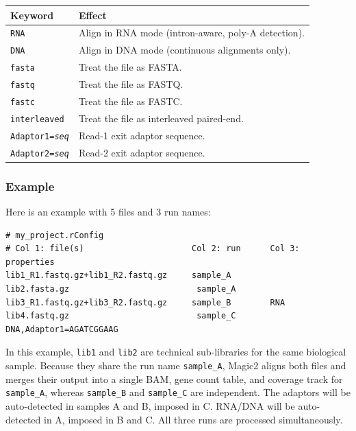 \documentclass[11pt]{article}
\newcommand{\code}[1]{\texttt{#1}}
\begin{document}
\medskip
\begin{center}
\begin{tabular}{lp{9.5cm}}
\toprule
\textbf{Keyword} & \textbf{Effect} \\
\midrule
\code{RNA}                   & Align in RNA mode (intron-aware, poly-A detection). \\
\code{DNA}                   & Align in DNA mode (continuous alignments only). \\
\code{fasta}                 & Treat the file as FASTA. \\
\code{fastq}                 & Treat the file as FASTQ. \\
\code{fastc}                 & Treat the file as FASTC. \\
\code{interleaved}           & Treat the file as interleaved paired-end. \\
\code{Adaptor1=\textit{seq}} & Read-1 exit adaptor sequence. \\
\code{Adaptor2=\textit{seq}} & Read-2 exit adaptor sequence. \\
\bottomrule
\end{tabular}
\end{center}
\medskip



\subsubsection{Example}

Here is an example with 5 files and 3 run names:

\begin{lstlisting}
# my_project.rConfig
# Col 1: file(s)                      Col 2: run      Col 3: properties
lib1_R1.fastq.gz+lib1_R2.fastq.gz     sample_A        
lib2.fasta.gz                          sample_A       
lib3_R1.fastq.gz+lib3_R2.fastq.gz     sample_B        RNA
lib4.fastq.gz                          sample_C       DNA,Adaptor1=AGATCGGAAG
\end{lstlisting}

In this example, \code{lib1} and \code{lib2} are technical sub-libraries
for the same biological sample.  Because they share the run name
\code{sample\_A}, Magic2 aligns both files and merges their output into
a single BAM, gene count table, and coverage track for \code{sample\_A},
whereas \code{sample\_B} and \code{sample\_C} are independent.
The adaptors will be auto-detected in samples A and B, imposed in C.
RNA/DNA will be auto-detected in A, imposed in B and C. 
All three runs are processed simultaneously.
\end{document}
